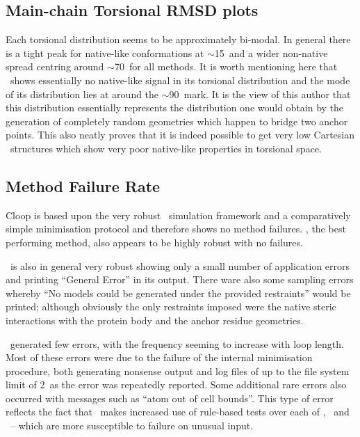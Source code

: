 \subsection{Main-chain Torsional RMSD plots}

Each torsional distribution seems to be approximately bi-modal. In general there is a tight peak for native-like conformations at $\sim$15\degree\ and a wider non-native spread centring around $\sim$70\degree\ for all methods. It is worth mentioning here that \cloop\ shows essentially no native-like signal in its torsional distribution and the mode of its distribution lies at around the $\sim$90\degree\ mark. It is the view of this author that this distribution essentially represents the distribution one would obtain by the generation of completely random geometries which happen to bridge two anchor points. This also neatly proves that it is indeed possible to get very low Cartesian \crms\ structures which show very poor native-like properties in torsional space.
  

\subsection{Method Failure Rate}

Cloop is based upon the very robust \charmm\ simulation framework and a comparatively simple minimisation protocol and therefore shows no method failures. \modloop, the best performing method, also appears to be highly robust with no failures.

\rapper\ is also in general very robust showing only a small number of application errors and printing ``General Error'' in its output. There ware also some sampling errors whereby ``No models could be generated under the provided restraints'' would be printed; although obviously the only restraints imposed were the native steric interactions with the protein body and the anchor residue geometries.

\plop\ generated few errors, with the frequency seeming to increase with loop length. Most of these errors were due to the failure of the internal minimisation procedure, both generating nonsense output and log files of up to the file system limit of 2\gb\ as the error was repeatedly reported.
Some
additional rare errors also occurred with messages such as ``atom out of cell bounds''. This type of error reflects the fact that \plop\ makes increased use of rule-based tests over each of \cloop, \modloop\ and \rapper\ -- which are more susceptible to failure on unusual input.

